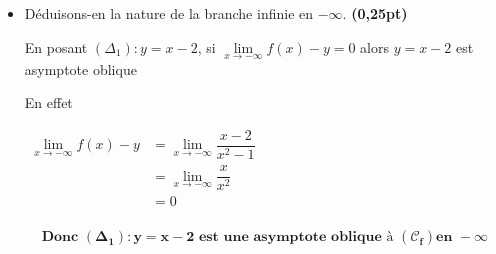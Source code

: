 \documentclass[12pt,a4paper]{article}
\begin{document}
\begin{enumerate}
\begin{enumerate}
\begin{itemize}
par identification  
$
 \begin{aligned}  
	\begin{cases} 
	a = 1\\
	b = -2\\
	c-a = 0\\
	d-b = 0
	\end{cases}
	&\implies
		\begin{cases} 
	a = 1\\
	b = -2\\
	c-1 = 0\\
	d+2 = 0
	\end{cases}
		&\implies
		\begin{cases} 
	a = 1\\
	b = -2\\
	c= 1\\
	d = -2
	\end{cases}
 \end{aligned} 
 $ 

Ainsi, $f(x)=x-2+\dfrac{x-2}{x^2-1}$   
         
        \item Déduisons-en la nature de la branche infinie en $-\infty$. \textbf{(0,25pt)}

En posant $(\Delta_1):  y = x -2$, si $ \lim\limits_{x \to -\infty} f(x) - y = 0 $ alors $y=x-2$ est asymptote oblique

En effet 

\(
\begin{aligned}
 \lim\limits_{x \to -\infty} f(x) - y &= \lim\limits_{x \to -\infty}\dfrac{x-2}{x^2-1} \\
 																	&= \lim\limits_{x \to -\infty} \dfrac{x}{x^2}\\
 																	&= 0\\
\end{aligned}    
\)        

    \begin{resultbox}
    \[
    \mathbf{ \text{Donc } (\Delta_1):  y = x -2 \text{ est une asymptote oblique à } (\mathcal{C}_f) \text{en } -\infty }
    \]
   \end{resultbox}      
        

\end{itemize}
\end{enumerate}
\end{enumerate}
\end{document}
